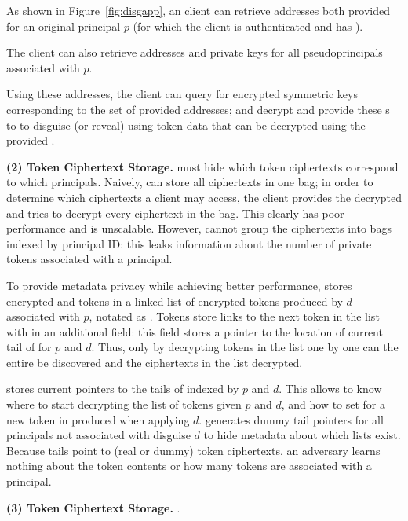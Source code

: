 As shown in Figure~\ref{fig:disgapp}, an \sys client can retrieve addresses both provided for an
original principal $p$ (for which the client is authenticated and has ). 

The client can also retrieve addresses and private keys for all pseudoprincipals associated with $p$.

Using these addresses, the client can query for encrypted symmetric \symk{} keys corresponding to
the set of provided addresses; and decrypt and provide these \symk{}s to \sys to disguise (or reveal) using token data that can be decrypted using the provided \symk{}.

\iffalse
\vspace{6pt}\noindent\textbf{(2) \tdata{} Token Ciphertext Storage.}
\sys must hide which token ciphertexts correspond to which principals.  Naively, \sys can store
all ciphertexts in one bag; in order to determine which ciphertexts a client may access, the client
provides the decrypted  and \sys tries to decrypt every ciphertext in the bag. This clearly
has poor performance and is unscalable.
However, \sys cannot group the ciphertexts into bags indexed by principal ID: this leaks information
about the number of private tokens associated with a principal.

To provide metadata privacy while achieving better performance, \sys stores encrypted  and
 tokens in a linked list of encrypted tokens produced by $d$ associated with $p$, notated
as . 
Tokens store links to the next token in the list with in an additional  field: this
field stores a pointer to the location of current tail of  for $p$ and $d$.
Thus, only by decrypting tokens in the list one by one can the entire  be discovered and
the ciphertexts in the list decrypted.

\sys stores current pointers to the tails of  indexed by $p$ and $d$. This allows \sys to
know where to start decrypting the list of tokens given $p$ and $d$, and how to set
 for a new token in  produced when applying $d$. \sys generates dummy
tail pointers for all principals not associated with disguise $d$ to hide metadata about which lists
exist.
Because  tails point to (real or dummy) token ciphertexts, an adversary learns nothing
about the token contents or how many tokens are associated with a principal.

\vspace{6pt}\noindent\textbf{(3) \tpriv{} Token Ciphertext Storage.}
.

